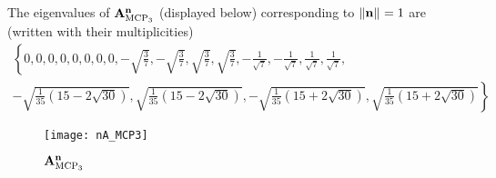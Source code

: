 \vspace*{2em}
The eigenvalues of $\mat{A}_{\MCPN[3]}^{\bn}$ (displayed below) corresponding to $\norm{\bn} = 1$ are (written with
their multiplicities) $$
\begin{multlined}
\textstyle
\left\{0,0,0,0,0,0,0,0,-\sqrt{\frac{3}{7}},-\sqrt{\frac{3}{7}},\sqrt{\frac{3}{7}},\sqrt{\frac{3}{7}},-\frac{1}{\sqrt{7}},
-\frac{1}{\sqrt{7}},\frac{1}{\sqrt{7}},\frac{1}{\sqrt{7}},\right.\\
\textstyle
\left.-\sqrt{\frac{1}{35} \left(15-2 \sqrt{30}\right)},
\sqrt{\frac{1}{35} \left(15-2 \sqrt{30}\right)},-\sqrt{\frac{1}{35} \left(15+2 \sqrt{30}\right)},\sqrt{\frac{1}{35} 
\left(15+2 \sqrt{30}\right)}\right\}
\end{multlined} 
$$

\begin{figure}[hbt]
\hspace*{-1.1cm}
  \texttt{[image: nA\_MCP3]}
  \caption{$\mat{A}_{\MCPN[3]}^{\bn}$}
  \label{fig:nAMCP3}
\end{figure}